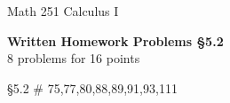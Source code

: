 \documentclass[11pt]{report}
\theoremstyle{plain}
\begin{document}
\hfill Math 251 Calculus I
\begin{center}
\Large{\textbf{Written Homework Problems \S 5.2}} \\
8 problems for 16 points\\
\end{center}

\begin{description}
\item{\S 5.2} \# 75,77,80,88,89,91,93,111\\


\end{description}
\end{document}
